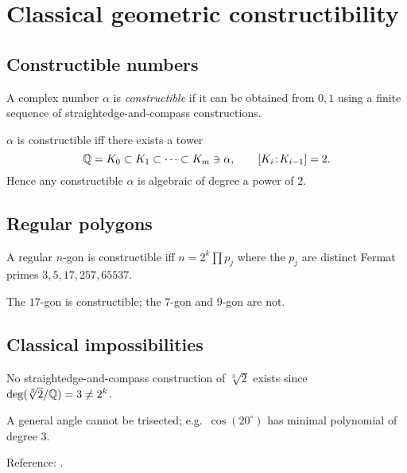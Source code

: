 \section{Classical geometric constructibility}\label{sec:constructibility}

\subsection{Constructible numbers}
\begin{definition}
A complex number $\alpha$ is \emph{constructible} if it can be obtained from $0,1$ using a finite sequence of straightedge-and-compass constructions.
\end{definition}
\begin{theorem}
$\alpha$ is constructible iff there exists a tower
\[
\mathbb{Q}=K_0\subset K_1\subset\cdots\subset K_m\ni \alpha,\qquad [K_i\!:\!K_{i-1}]=2.
\]
Hence any constructible $\alpha$ is algebraic of degree a power of $2$.
\end{theorem}

\subsection{Regular polygons}
\begin{theorem}
A regular $n$-gon is constructible iff $n=2^k \prod p_j$ where the $p_j$ are distinct Fermat primes $3,5,17,257,65537$.
\end{theorem}
\begin{example}
The $17$-gon is constructible; the $7$-gon and $9$-gon are not.
\end{example}

\subsection{Classical impossibilities}
\begin{corollary}
No straightedge-and-compass construction of $\sqrt[3]{2}$ exists since $\deg(\sqrt[3]{2}/\mathbb{Q})=3\ne 2^k$.
\end{corollary}
\begin{corollary}
A general angle cannot be trisected; e.g.\ $\cos(20^\circ)$ has minimal polynomial of degree $3$.
\end{corollary}
Reference: \cite[\S13]{DF}.
